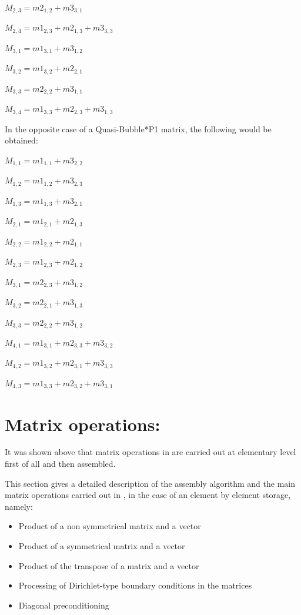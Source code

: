 $M_{2,3} = m2_{1,2} + m3_{3,1}$

$M_{2,4} = m1_{2,3} + m2_{1,3} + m3_{3,3}$

$M_{3,1} = m1_{3,1} + m3_{1,2}$

$M_{3,2} = m1_{3,2} + m2_{2,1}$

$M_{3,3} = m2_{2,2} + m3_{1,1}$

$M_{3,4} = m1_{3,3} + m2_{2,3} + m3_{1,3}$

In the opposite case of a Quasi-Bubble*P1 matrix, the following would be obtained:

$M_{1,1} = m1_{1,1} + m3_{2,2}$

$M_{1,2} = m1_{1,2} + m3_{2,3}$

$M_{1,3} = m1_{1,3} + m3_{2,1}$

$M_{2,1} = m1_{2,1} + m2_{1,3}$

$M_{2,2} = m1_{2,2} + m2_{1,1}$

$M_{2,3} = m1_{2,3} + m2_{1,2}$

$M_{3,1} = m2_{2,3} + m3_{1,2}$

$M_{3,2} = m2_{2,1} + m3_{1,3}$

$M_{3,3} = m2_{2,2} + m3_{1,2}$

$M_{4,1} = m1_{3,1} + m2_{3,3} + m3_{3,2}$

$M_{4,2} = m1_{3,2} + m2_{3,1} + m3_{3,3}$

$M_{4,3} = m1_{3,3} + m2_{3,2} + m3_{3,1}$

\section{Matrix operations:}

It was shown above that matrix operations in \bief are carried out at elementary
level first of all and then assembled.

This section gives a detailed description of the assembly algorithm and the
main matrix operations carried out in \bief, in the case of an element by
element storage, namely:
\begin{itemize}
  \item Product of a non symmetrical matrix and a vector
  \item Product of a symmetrical matrix and a vector
  \item Product of the transpose of a matrix and a vector
  \item Processing of Dirichlet-type boundary conditions in the matrices
  \item Diagonal preconditioning
\end{itemize}

